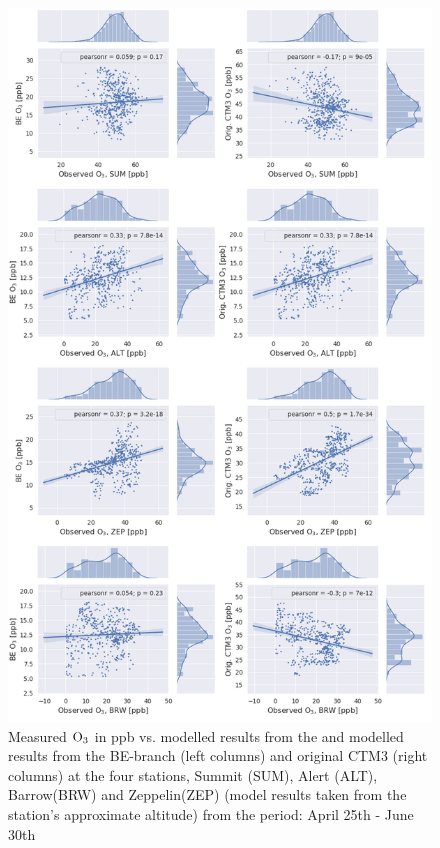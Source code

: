 \begin{figure}[ht]
    \centering
    \includegraphics[width = 0.8\linewidth]{Chapter6_Results/images/jointplot_AprJune_O3_2001.png}
    \caption{Measured $\mathrm{O_3}$ in ppb vs. modelled results from the and modelled results from the BE-branch (left columns) and original CTM3 (right columns) at the four stations, Summit (SUM), Alert (ALT), Barrow(BRW) and Zeppelin(ZEP) (model results taken from the station's approximate altitude) from the period: April 25th - June 30th}
    \label{fig:joint_AprMay}
\end{figure}